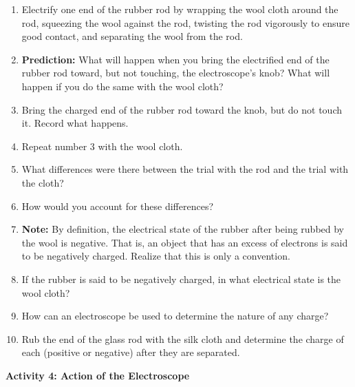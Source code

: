 \begin{enumerate}
\item Electrify one end of the rubber rod by wrapping the wool cloth around
the rod, squeezing the wool against the rod, twisting the rod vigorously
to ensure good contact, and separating the wool from the rod.
\item \textbf{Prediction:} What will happen when you bring the electrified
end of the rubber rod toward, but not touching, the electroscope's
knob? What will happen if you do the same with the wool cloth?\vspace{15mm}

\item Bring the charged end of the rubber rod toward the knob, but do not
touch it. Record what happens.\vspace{15mm}

\item Repeat number 3 with the wool cloth.\vspace{15mm}

\item What differences were there between the trial with the rod and the
trial with the cloth?\vspace{15mm}

\item How would you account for these differences?\vspace{15mm}

\item \textbf{Note:} By definition, the electrical state of the rubber after
being rubbed by the wool is negative. That is, an object that has
an excess of electrons is said to be negatively charged. Realize that
this is only a convention.
\item If the rubber is said to be negatively charged, in what electrical
state is the wool cloth?\vspace{15mm}

\item How can an electroscope be used to determine the nature of any charge?\vspace{15mm}

\item Rub the end of the glass rod with the silk cloth and determine the
charge of each (positive or negative) after they are separated.\vspace{15mm}

\end{enumerate}
\textbf{Activity 4: Action of the Electroscope}

